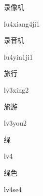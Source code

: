 \begin{verbete}[lu4xiang4ji1]{录像机}
\begin{pronuncia}{lu4xiang4ji1}
\end{pronuncia}
\end{verbete}

\begin{verbete}[lu4yin1ji1]{录音机}
\begin{pronuncia}{lu4yin1ji1}
\end{pronuncia}
\end{verbete}

\begin{verbete}[lv3xing2]{旅行}
\begin{pronuncia}{lv3xing2}
\end{pronuncia}
\end{verbete}

\begin{verbete}[lv3you2]{旅游}
\begin{pronuncia}{lv3you2}
\end{pronuncia}
\end{verbete}

\begin{verbete}[lv4]{绿}
\begin{pronuncia}{lv4}
\end{pronuncia}
\end{verbete}

\begin{verbete}[lv4se4]{绿色}
\begin{pronuncia}{lv4se4}
\end{pronuncia}
\end{verbete}

